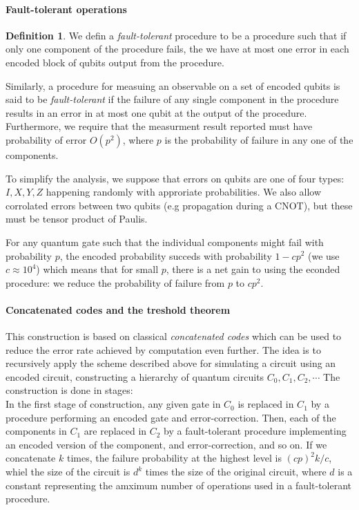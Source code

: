 \documentclass[11pt,a4paper]{article}
\theoremstyle{definition}
\newtheorem{definition}{Definition}[section]
\theoremstyle{plain}
\theoremstyle{remark}
\begin{document}
\paragraph{Fault-tolerant operations} 
\begin{definition}
  We defin a \emph{fault-tolerant} procedure to be a procedure such that if only one component of the procedure fails, 
  the we have at most one error in each encoded block of qubits output from the procedure.

  Similarly, a procedure for measuing an observable on a set of encoded qubits is said to be \emph{fault-tolerant} 
  if the failure of any single component in the procedure results in an error in at most one qubit at the output of the procedure. 
  Furthermore, we require that the measurment result reported must have probability of error $O(p^2)$, where $p$ 
  is the probability of failure in any one of the components.
\end{definition}

To simplify the analysis, we suppose that errors on qubits are one of four types: $I, X, Y, Z$ happening randomly with 
approriate probabilities. We also allow corrolated errors between two qubits (e.g propagation during a CNOT), but these must be tensor product of Paulis. 

For any quantum gate such that the individual components might fail with probability $p$, the 
encoded probability succeds with probability $1 - cp^2$ (we use $c \approx 10^{4}$) which means that 
for small $p$, there is a net gain to using the econded procedure: we reduce the probability of failure 
from $p$ to $cp^2$.

\paragraph{Concatenated codes and the treshold theorem} This construction is based on 
classical \emph{concatenated codes} which can be used to reduce the error rate achieved by computation even further. 
The idea is to recursively apply the scheme described above for simulating a circuit using an encoded circuit, 
constructing a hierarchy of quantum circuits $C_0, C_1, C_2, \cdots$ The construction is done in stages: \\
In the first stage of construction, any given gate in $C_0$ is replaced in $C_1$ by a procedure performing an 
encoded gate and error-correction. Then, each of the components in $C_1$ are replaced in $C_2$ by a fault-tolerant procedure 
implementing an encoded version of the component, and error-correction, and so on. If we concatenate $k$ times, the failure probability 
at the highest level is $(cp)^2k / c$, whiel the size of the circuit is $d^k$ times the size of the original circuit, 
where $d$ is a constant representing the amximum number of operations used in a fault-tolerant procedure. 
\end{document}
